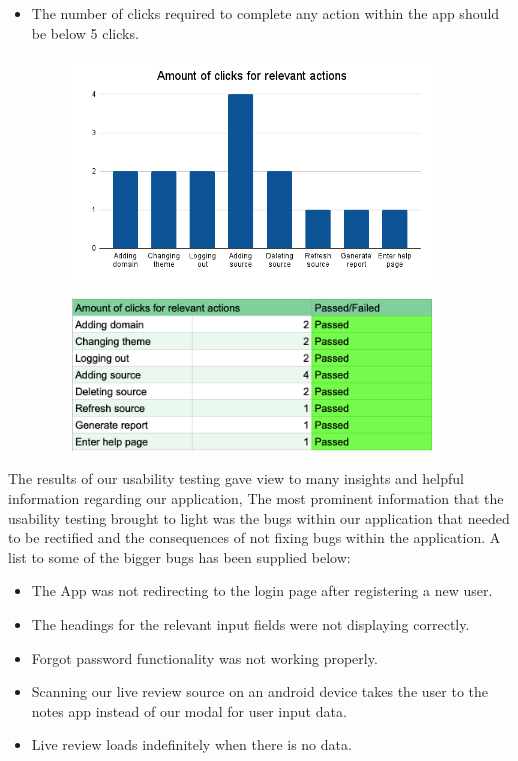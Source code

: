 \documentclass[12pt]{article}
\begin{document}
\begin{itemize}
\begin{itemize}
              \item The number of clicks required to complete any action within the app should be below 5 clicks.
                    \begin{figure}[H]
                        \centering
                        \includegraphics[width=0.9\textwidth]{Amount of clicks for relevant actions-2.png}
                    \end{figure}
                    \begin{figure}[H]
                        \centering
                        \includegraphics[width=0.9\textwidth]{table.png}
                    \end{figure}
          \end{itemize}
\end{itemize}
The results of our usability testing gave view to many insights and helpful information regarding our application, The most prominent information that the usability testing brought to light was the bugs within our application that needed to be rectified and the consequences of not fixing bugs within the application.
A list to some of the bigger bugs has been supplied below:
\begin{itemize}
    \item The App was not redirecting to the login page after registering a new user.
    \item The headings for the relevant input fields were not displaying correctly.
    \item Forgot password functionality was not working properly.
    \item Scanning our live review source on an android device takes the user to the notes app instead of our modal for user input data.
    \item Live review loads indefinitely when there is no data.
\end{itemize}
\end{document}
